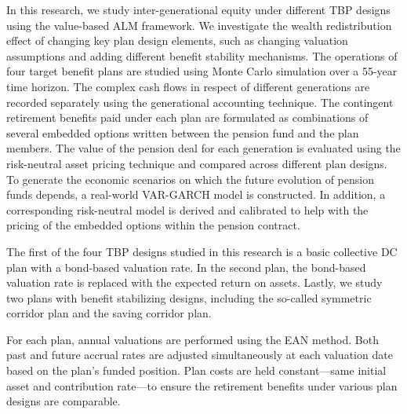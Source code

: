 \documentclass{sfuthesis}
\numberwithin{equation}{chapter}
\begin{document}
		\justify
		In this research, we study inter-generational equity under different TBP designs using the value-based ALM framework. We investigate the wealth redistribution effect of changing key plan design elements, such as changing valuation assumptions and adding different benefit stability mechanisms. The operations of four target benefit plans are studied using Monte Carlo simulation over a 55-year time horizon. The complex cash flows in respect of different generations are recorded separately using the generational accounting technique. The contingent retirement benefits paid under each plan are formulated as combinations of several embedded options written between the pension fund and the plan members. The value of the pension deal for each generation is evaluated using the risk-neutral asset pricing technique and compared across different plan designs. To generate the economic scenarios on which the future evolution of pension funds depends, a real-world VAR-GARCH model is constructed. In addition, a corresponding risk-neutral model is derived and calibrated to help with the pricing of the embedded options within the pension contract.
	
		\justify
		The first of the four TBP designs studied in this research is a basic collective DC plan with a bond-based valuation rate. In the second plan, the bond-based valuation rate is replaced with the expected return on assets. Lastly, we study two plans with benefit stabilizing designs, including the so-called symmetric corridor plan and the saving corridor plan. 
	
	
		\justify
		For each plan, annual valuations are performed using the EAN method. Both past and future accrual rates are adjusted simultaneously at each valuation date based on the plan's funded position. Plan costs are held constant---same initial asset and contribution rate---to ensure the retirement benefits under various plan designs are comparable. 
	
\end{document}
